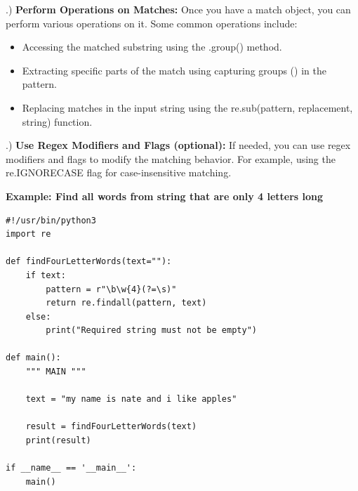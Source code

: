 \documentclass{report}
\begin{document}
    \bigbreak {}.) \textbf{Perform Operations on Matches:}
    \bigbreak \noindent 
    Once you have a match object, you can perform various operations on it. Some common operations include:
    \begin{itemize}
        \item Accessing the matched substring using the .group() method.
        \item Extracting specific parts of the match using capturing groups () in the pattern.
        \item Replacing matches in the input string using the re.sub(pattern, replacement, string) function.
    \end{itemize}

    \pagebreak \bigbreak {}.) \textbf{Use Regex Modifiers and Flags (optional):}
    \bigbreak \noindent 
    If needed, you can use regex modifiers and flags to modify the matching behavior. For example, using the re.IGNORECASE flag for case-insensitive matching.

    \bigbreak \noindent 
    \begin{mdframed}
      \textbf{Example: Find all words from string that are only 4 letters long}
      \begin{verbatim}
#!/usr/bin/python3
import re

def findFourLetterWords(text=""):
    if text:
        pattern = r"\b\w{4}(?=\s)"
        return re.findall(pattern, text)
    else:
        print("Required string must not be empty")

def main():
    """ MAIN """

    text = "my name is nate and i like apples"

    result = findFourLetterWords(text)
    print(result)

if __name__ == '__main__':
    main()
      \end{verbatim}
    \end{mdframed}

    \pagebreak \bigbreak \noindent
\end{document}
